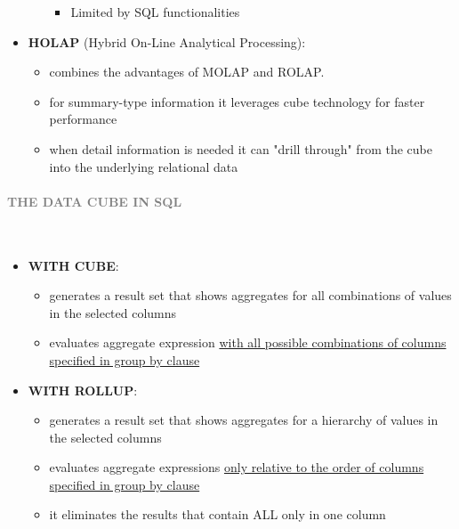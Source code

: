 \documentclass[10pt,a4paper]{article}
\newcommand{\myparagraph}[1]{\paragraph{\normalsize{\textcolor{gray}{\uppercase{\textbf{#1}}}} }\mbox{} \vspace{0.5em}\\}
\begin{document}
\begin{itemize}
\begin{itemize}
\begin{itemize}
			\item Limited by SQL functionalities
		\end{itemize}
	\end{itemize}		
	\item \textbf{HOLAP} (Hybrid On-Line Analytical Processing):
	\begin{itemize}
		\item combines the advantages of MOLAP and ROLAP.
		\item for summary-type information it leverages cube technology for faster performance
		\item when detail information is needed it can "drill through" from the cube into the underlying relational data
\end{itemize}	 
\end{itemize}
\myparagraph{The Data Cube in SQL}
\begin{itemize}
	\item \textbf{WITH CUBE}: 
	\begin{itemize}
		\item generates a result set that shows aggregates for all combinations of values in the selected columns
		\item evaluates aggregate expression \uline{with all possible combinations of columns specified in group by clause}
	\end{itemize}
	\item \textbf{WITH ROLLUP}:
	\begin{itemize}
		\item generates a result set that shows aggregates for a hierarchy of values in the selected columns
		\item evaluates aggregate expressions \uline{only relative to the order of columns specified in group by clause}
		\item it eliminates the results that contain ALL only in one column
	\end{itemize}		
\end{itemize}
\end{document}
